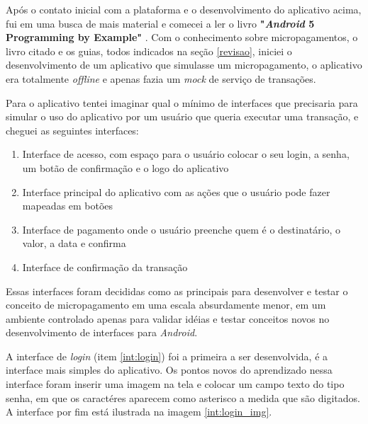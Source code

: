 \documentclass[hidelinks,12pt]{article}
\begin{document}
Ap\'os o contato inicial com a plataforma e o desenvolvimento do aplicativo acima, fui em uma busca de mais material e comecei a ler o livro \textbf{"\textit{{Android}} 5 Programming by Example"} \cite{andppe}. Com o conhecimento sobre micropagamentos, o livro citado e os guias, todos indicados na se\c{c}\~ao \ref{revisao}, iniciei o desenvolvimento de um aplicativo que simulasse um micropagamento, o aplicativo era totalmente \textit{offline} e apenas fazia um \textit{mock} de servi\c{c}o de transa\c{c}\~oes.

Para o aplicativo tentei imaginar qual o m\'inimo de interfaces que precisaria para simular o uso do aplicativo por um usu\'ario que queria executar uma transa\c{c}\~ao, e cheguei as seguintes interfaces:
\begin{enumerate}
	\item \label{int:login}Interface de acesso, com espa\c{c}o para o usu\'ario colocar o seu login, a senha, um bot\~ao de confirma\c{c}\~ao e o logo do aplicativo
	\item \label{int:main}Interface principal do aplicativo com as a\c{c}\~oes que o usu\'ario pode fazer mapeadas em bot\~oes
	\item \label{int:pay}Interface de pagamento onde o usu\'ario preenche quem \'e o destinat\'ario, o valor, a data e confirma
	\item \label{int:confirm}Interface de confirma\c{c}\~ao da transa\c{c}\~ao
\end{enumerate}
Essas interfaces foram decididas como as principais para desenvolver e testar o conceito de micropagamento em uma escala absurdamente menor, em um ambiente controlado apenas para validar id\'eias e testar conceitos novos no desenvolvimento de interfaces para \textit{Android}.

A interface de \textit{login} (item \ref{int:login}) foi a primeira a ser desenvolvida, \'e a interface mais simples do aplicativo. Os pontos novos do aprendizado nessa interface foram inserir uma imagem na tela e colocar um campo texto do tipo senha, em que os caract\'eres aparecem como asterisco a medida que s\~ao digitados. A interface por fim est\'a ilustrada na imagem \ref{int:login_img}.
\end{document}

